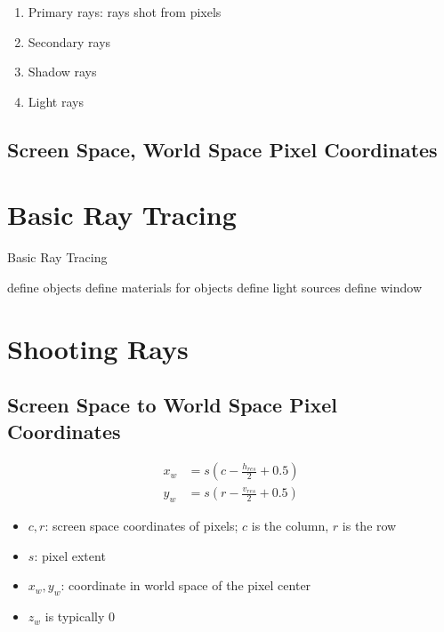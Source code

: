     \begin{enumerate}
      \item Primary rays: rays shot from pixels
      \item Secondary rays
      \item Shadow rays
      \item Light rays
    \end{enumerate}

  \subsection{Screen Space, World Space Pixel Coordinates}

\section{Basic Ray Tracing}

  \begin{algorithm}[H]
    \caption{Basic Ray Tracing}
    define objects\;
    define materials for objects\;
    define light sources\;
    define window\;
  \end{algorithm}

\section{Shooting Rays}

  \subsection{Screen Space to World Space Pixel Coordinates}

    \begin{align}
      x_{w} &= s\left( c - \frac{h_{res}}{2} + 0.5 \right) \\
      y_{w} &= s\left( r - \frac{v_{res}}{2} + 0.5 \right)
    \end{align}

    \begin{itemize}
      \item $ c, r $: screen space coordinates of pixels; $ c $ is the column,
      $ r $ is the row
      \item $ s $: pixel extent
      \item $ x_{w}, y_{w} $: coordinate in world space of the pixel center
      \item $ z_{w} $ is typically $ 0 $
    \end{itemize}

